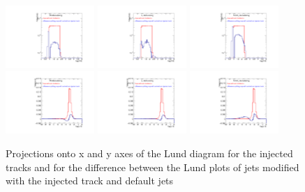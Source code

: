 \begin{figure}[h]
\centering
\includegraphics[width=0.3\textwidth]{figures/LundMC/projectxca}
\includegraphics[width=0.3\textwidth]{figures/LundMC/projectxkt}
\includegraphics[width=0.3\textwidth]{figures/LundMC/projectxakt}
\includegraphics[width=0.3\textwidth]{figures/LundMC/projectyca}
\includegraphics[width=0.3\textwidth]{figures/LundMC/projectykt}
\includegraphics[width=0.3\textwidth]{figures/LundMC/projectyakt}
\caption{Projections onto x and y axes of the Lund diagram for the injected tracks and for the difference between the Lund plots of jets modified with the injected track and default jets}
\label{fig:toymodeltracks}
\end{figure}








